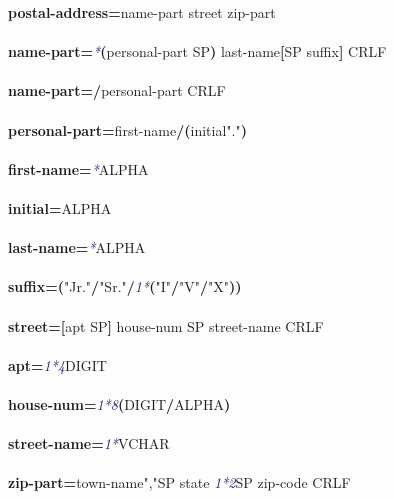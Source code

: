 \documentclass{article}
\begin{document}
{\footnotesize\ttfamily
\textbf{postal-{}address}\textbf{=}name-{}part street zip-{}part\\
\\
\textbf{name-{}part}\textbf{=}\textcolor{MidnightBlue}{\emph{*}}\textbf{(}personal-{}part SP\textbf{)} last-{}name\textbf{[}SP suffix\textbf{]} CRLF\\
\\
\textbf{name-{}part}\textbf{=/}personal-{}part CRLF\\
\\
\textbf{personal-{}part}\textbf{=}first-{}name\textbf{/}\textbf{(}initial\textcolor{BrickRed}{"."}\textbf{)}\\
\\
\textbf{first-{}name}\textbf{=}\textcolor{MidnightBlue}{\emph{*}}ALPHA\\
\\
\textbf{initial}\textbf{=}ALPHA\\
\\
\textbf{last-{}name}\textbf{=}\textcolor{MidnightBlue}{\emph{*}}ALPHA\\
\\
\textbf{suffix}\textbf{=}\textbf{(}\textcolor{BrickRed}{"Jr."}\textbf{/}\textcolor{BrickRed}{"Sr."}\textbf{/}\textcolor{MidnightBlue}{\emph{1*}}\textbf{(}\textcolor{BrickRed}{"I"}\textbf{/}\textcolor{BrickRed}{"V"}\textbf{/}\textcolor{BrickRed}{"X"}\textbf{)}\textbf{)}\\
\\
\textbf{street}\textbf{=}\textbf{[}apt SP\textbf{]} house-{}num SP street-{}name CRLF\\
\\
\textbf{apt}\textbf{=}\textcolor{MidnightBlue}{\emph{1*4}}DIGIT\\
\\
\textbf{house-{}num}\textbf{=}\textcolor{MidnightBlue}{\emph{1*8}}\textbf{(}DIGIT\textbf{/}ALPHA\textbf{)}\\
\\
\textbf{street-{}name}\textbf{=}\textcolor{MidnightBlue}{\emph{1*}}VCHAR\\
\\
\textbf{zip-{}part}\textbf{=}town-{}name\textcolor{BrickRed}{","}SP state \textcolor{MidnightBlue}{\emph{1*2}}SP zip-{}code CRLF\\
\\

}
\end{document}
